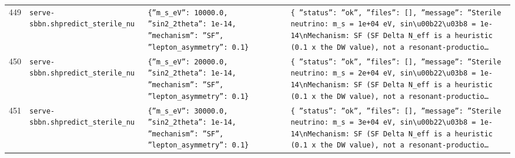\documentclass[11pt,a4paper]{article}
\begin{document}
\begin{longtable}{@{}p{}p{}p{}p{}@{}}
449 & \texttt{serve-sbbn.sh}\newline\texttt{predict\_\allowbreak{}sterile\_\allowbreak{}nu} & \texttt{\{''m\_\allowbreak{}s\_\allowbreak{}eV'':\allowbreak{} 10000.0,\allowbreak{} ''sin2\_\allowbreak{}2theta'':\allowbreak{} 1e-14,\allowbreak{} ''mechanism'':\allowbreak{} ''SF'',\allowbreak{} ''lepton\_\allowbreak{}asymmetry'':\allowbreak{} 0.1\}\allowbreak{}} & \texttt{\{   ''status'':\allowbreak{} ''ok'',\allowbreak{}   ''files'':\allowbreak{} []\allowbreak{},\allowbreak{}   ''message'':\allowbreak{} ''Sterile neutrino:\allowbreak{} m\_\allowbreak{}s =\allowbreak{} 1e+04 eV,\allowbreak{} sin\textbackslash{}\allowbreak{}u00b22\textbackslash{}\allowbreak{}u03b8 =\allowbreak{} 1e-14\textbackslash{}\allowbreak{}nMechanism:\allowbreak{} SF (SF Delta N\_\allowbreak{}eff is a heuristic (0.1 x the DW value)\allowbreak{},\allowbreak{} not a resonant-productio\ldots{}\allowbreak{}} \\
450 & \texttt{serve-sbbn.sh}\newline\texttt{predict\_\allowbreak{}sterile\_\allowbreak{}nu} & \texttt{\{''m\_\allowbreak{}s\_\allowbreak{}eV'':\allowbreak{} 20000.0,\allowbreak{} ''sin2\_\allowbreak{}2theta'':\allowbreak{} 1e-14,\allowbreak{} ''mechanism'':\allowbreak{} ''SF'',\allowbreak{} ''lepton\_\allowbreak{}asymmetry'':\allowbreak{} 0.1\}\allowbreak{}} & \texttt{\{   ''status'':\allowbreak{} ''ok'',\allowbreak{}   ''files'':\allowbreak{} []\allowbreak{},\allowbreak{}   ''message'':\allowbreak{} ''Sterile neutrino:\allowbreak{} m\_\allowbreak{}s =\allowbreak{} 2e+04 eV,\allowbreak{} sin\textbackslash{}\allowbreak{}u00b22\textbackslash{}\allowbreak{}u03b8 =\allowbreak{} 1e-14\textbackslash{}\allowbreak{}nMechanism:\allowbreak{} SF (SF Delta N\_\allowbreak{}eff is a heuristic (0.1 x the DW value)\allowbreak{},\allowbreak{} not a resonant-productio\ldots{}\allowbreak{}} \\
451 & \texttt{serve-sbbn.sh}\newline\texttt{predict\_\allowbreak{}sterile\_\allowbreak{}nu} & \texttt{\{''m\_\allowbreak{}s\_\allowbreak{}eV'':\allowbreak{} 30000.0,\allowbreak{} ''sin2\_\allowbreak{}2theta'':\allowbreak{} 1e-14,\allowbreak{} ''mechanism'':\allowbreak{} ''SF'',\allowbreak{} ''lepton\_\allowbreak{}asymmetry'':\allowbreak{} 0.1\}\allowbreak{}} & \texttt{\{   ''status'':\allowbreak{} ''ok'',\allowbreak{}   ''files'':\allowbreak{} []\allowbreak{},\allowbreak{}   ''message'':\allowbreak{} ''Sterile neutrino:\allowbreak{} m\_\allowbreak{}s =\allowbreak{} 3e+04 eV,\allowbreak{} sin\textbackslash{}\allowbreak{}u00b22\textbackslash{}\allowbreak{}u03b8 =\allowbreak{} 1e-14\textbackslash{}\allowbreak{}nMechanism:\allowbreak{} SF (SF Delta N\_\allowbreak{}eff is a heuristic (0.1 x the DW value)\allowbreak{},\allowbreak{} not a resonant-productio\ldots{}\allowbreak{}} \\

\end{longtable}
\end{document}
